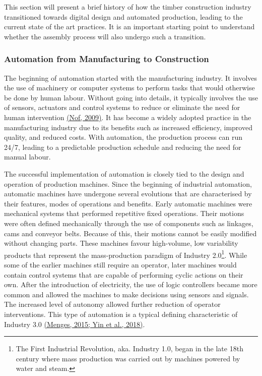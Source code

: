 \documentclass[11pt]{book}
\begin{document}
This section will present a brief history of how the timber construction industry transitioned towards digital design and automated production, leading to the current state of the art practices. It is an important starting point to understand whether the assembly process will also undergo such a transition. 

\subsubsection{Automation from Manufacturing to Construction}

The beginning of automation started with the manufacturing industry. It involves the use of machinery or computer systems to perform tasks that would otherwise be done by human labour. Without going into details, it typically involves the use of sensors, actuators and control systems to reduce or eliminate the need for human intervention \href{https://www.zotero.org/google-docs/?WadYaU}{(Nof, 2009)}. It has become a widely adopted practice in the manufacturing industry due to its benefits such as increased efficiency, improved quality, and reduced costs. With automation, the production process can run 24/7, leading to a predictable production schedule and reducing the need for manual labour. 

The successful implementation of automation is closely tied to the design and operation of production machines. Since the beginning of industrial automation, automatic machines have undergone several evolutions that are characterised by their features, modes of operations and benefits. Early automatic machines were mechanical systems that performed repetitive fixed operations. Their motions were often defined mechanically through the use of components such as linkages, cams and conveyor belts. Because of this, their motions cannot be easily modified without changing parts. These machines favour high-volume, low variability products that represent the mass-production paradigm of Industry 2.0\footnote{ The First Industrial Revolution, aka. Industry 1.0, began in the late 18th century where mass production was carried out by machines powered by water and steam.}. While some of the earlier machines still require an operator, later machines would contain control systems that are capable of performing cyclic actions on their own. After the introduction of electricity, the use of logic controllers became more common and allowed the machines to make decisions using sensors and signals. The increased level of autonomy allowed further reduction of operator interventions. This type of automation is a typical defining characteristic of Industry 3.0 \href{https://www.zotero.org/google-docs/?idxPsd}{(Menges, 2015; Yin et al., 2018)}. 
\end{document}

